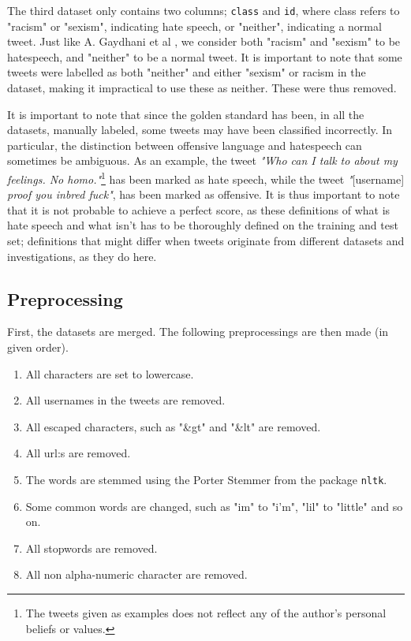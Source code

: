 \documentclass[twocolumn]{article}
\makeatletter
\newcommand\footnoteref[1]{\protected@xdef\@thefnmark{\ref{#1}}\@footnotemark}
\makeatother
\begin{document}
The third dataset only contains two columns; \verb|class| and \verb|id|, where class refers to "racism" or "sexism", indicating hate speech, or "neither", indicating a normal tweet. Just like A. Gaydhani et al \cite{gaydhani}, we consider both "racism" and "sexism" to be hatespeech, and "neither" to be a normal tweet. It is important to note that some tweets were labelled as both "neither" and either "sexism" or racism in the dataset, making it impractical to use these as neither. These were thus removed.

It is important to note that since the golden standard has been, in all the datasets, manually labeled, some tweets may have been classified incorrectly. In particular, the distinction between offensive language and hatespeech can sometimes be ambiguous. As an example, the tweet \textit{"Who can I talk to about my feelings. No homo."}\footnote{\label{tweet} The tweets given as examples does not reflect any of the author's personal beliefs or values.} has been marked as hate speech, while the tweet \textit{"}[username] \textit{proof you inbred fuck"}\footnoteref{tweet}, has been marked as offensive. It is thus important to note that it is not probable to achieve a perfect score, as these definitions of what is hate speech and what isn't has to be thoroughly defined on the training and test set; definitions that might differ when tweets originate from different datasets and investigations, as they do here. 

\subsection{Preprocessing}

First, the datasets are merged. The following preprocessings are then made (in given order). 

\begin{enumerate}
\item All characters are set to lowercase. 
\item All usernames in the tweets are removed.
\item All escaped characters, such as "\&gt" and "\&lt" are removed. 
\item All url:s are removed. 
\item The words are stemmed using the Porter Stemmer from the package \verb|nltk|.
\item Some common words are changed, such as "im" to "i'm", "lil" to "little" and so on. 
\item All stopwords are removed.
\item All non alpha-numeric character are removed. 
\end{enumerate}
\end{document}
